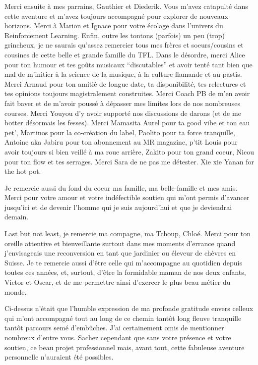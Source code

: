 Merci ensuite à mes parrains, Gauthier et Diederik. Vous m'avez catapulté dans cette aventure et m'avez toujours accompagné pour explorer de nouveaux horizons. Merci à Marion et Ignace pour votre écolage dans l'univers du Reinforcement Learning. Enfin, outre les tontons (parfois) un peu (trop) grincheux, je ne saurais qu'assez remercier tous mes frères et soeurs/cousins et cousines de cette belle et grande famille du TFL. Dans le désordre, merci Alice pour ton humour et tes goûts musicaux ``discutables'' et avoir tenté tant bien que mal de m'initier à la science de la musique, à la culture flamande et au pastis. Merci Arnaud pour ton amitié de longue date, ta disponibilité, tes relectures et tes opinions toujours magistralement construites. Merci Coach PB de m'en avoir fait baver et de m'avoir poussé à dépasser mes limites lors de nos nombreuses courses. Merci Youyou d'y avoir supporté nos discussions de darons (et de me botter désormais les fesses). Merci Mamasita Aurel pour ta good vibe et ton eau pet', Martinos pour la co-création du label, Paolito pour ta force tranquille, Antoine aka Jabiru pour ton abonnement au MR magazine, p'tit Louis pour avoir toujours si bien veillé à ma roue arrière, Zakito pour ton grand coeur, Nicou pour ton flow et tes serrages. Merci Sara de ne pas me détester. Xie xie Yanan for the hot pot.

Je remercie aussi du fond du coeur ma famille, ma belle-famille et mes amis. Merci pour votre amour et votre indéfectible soutien qui m'ont permis d'avancer jusqu'ici et de devenir l'homme qui je suis aujourd'hui et que je deviendrai demain.

Last but not least, je remercie ma compagne, ma Tchoup, Chloé. Merci pour ton oreille attentive et bienveillante surtout dans mes moments d'errance quand j'envisageais une reconversion en tant que jardinier ou éleveur de chèvres en Suisse. Je te remercie aussi d'être celle qui m'accompagne au quotidien depuis toutes ces années, et, surtout, d'être la formidable maman de nos deux enfants, Victor et Oscar, et de me permettre ainsi d'exercer le plus beau métier du monde.

Ci-dessus n'était que l'humble expression de ma profonde gratitude envers celleux qui m'ont accompagné tout au long de ce chemin tantôt long fleuve tranquille tantôt parcours semé d'embûches. J'ai certainement omis de mentionner nombreux d'entre vous. Sachez cependant que sans votre présence et votre soutien, ce beau projet professionnel mais, avant tout, cette fabuleuse aventure personnelle n'auraient été possibles.





